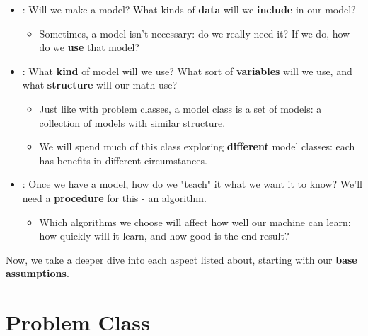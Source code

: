         \begin{itemize}
            \item {}: Will we make a model? What kinds of \textbf{data} will we \textbf{include} in our model?
            
                \begin{itemize}
                    \item Sometimes, a model isn't necessary: do we really need it? If we do, how do we \textbf{use} that model?
                \end{itemize}
            
            \item {}: What \textbf{kind} of model will we use? What sort of \textbf{variables} will we use, and what \textbf{structure} will our math use? 
                
                \begin{itemize}
                    \item Just like with problem classes, a model class is a set of models: a collection of models with similar structure.
                    \item We will spend much of this class exploring \textbf{different} model classes: each has benefits in different circumstances.
                \end{itemize}
                
            \item {}: Once we have a model, how do we "teach" it what we want it to know? We'll need a \textbf{procedure} for this - an algorithm.
                
                \begin{itemize}
                    \item Which algorithms we choose will affect how well our machine can learn: how quickly will it learn, and how good is the end result?
                \end{itemize}
        \end{itemize}
        
        Now, we take a deeper dive into each aspect listed about, starting with our \textbf{base assumptions}.

\pagebreak



\section{Problem Class}

